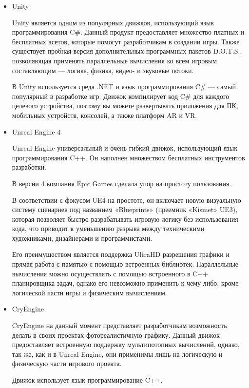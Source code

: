 \documentclass[bachelor, och, coursework, times]{SCWorks}
\begin{document}
 \begin{itemize}
     
\item  Unity

Unity является одним из популярных движков, 
использующий язык программирования C\#. 
Данный продукт предоставляет множество платных и бесплатных асетов, 
которые помогут разработчикам в создании игры. 
Также существует пробная версия дополнительных программных пакетов D.O.T.S., 
позволяющая применять параллельные вычисления ко всем игровым составляющим 
— логика, физика, видео- и звуковые потоки.

В Unity используется среда .NET и язык программирования C\# — самый популярный в разработке игр. 
Движок компилирует код C\# для каждого целевого устройства, 
поэтому вы можете развертывать приложения для ПК, мобильных устройств, консолей,
 а также платформ AR и VR.\cite{search1}

\item Unreal Engine 4

Unreal Engine универсальный и очень гибкий движок, 
использующий язык программирования C++. 
Он наполнен множеством бесплатных инструментов разработки. 

В версии 4 компания Epic Games сделала упор на простоту пользования.

В соответствии с фокусом UE4 на простоте, 
он включает новую визуальную систему сценариев под названием «Blueprints» 
(преемник «Kismet» UE3), которая позволяет быстро разрабатывать игровую логику 
без использования кода, что приводит к уменьшению разрыва между техническими художниками, 
дизайнерами и программистами.\cite{search2}

Его преимуществом является поддержка UltraHD разрешения графики и прямая работа 
с памятью с помощью встроенных библиотек. 
Параллельные вычисления можно осуществлять с помощью встроенного в C++ 
планировщика задач, однако его невозможно применить к чему-либо, 
кроме логической части игры и физическим вычислениям.

\item CryEngine

CryEngine на данный момент представляет разработчикам возможность делать 
в своих проектах фотореалистичную графику.\cite{search3} 
Данный движок предоставляет встроенную поддержку мультипотопных вычислений, 
однако, так же, как и в Unreal Engine, 
они применимы лишь на логическую и физическую части игрового проекта. 

Движок использует язык программирование C++.



\end{itemize}
\end{document}
